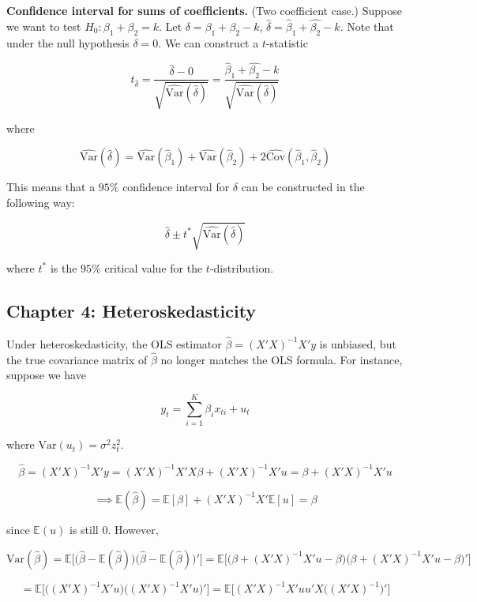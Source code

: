 \documentclass{article}
\newcommand{\E}{\mathbb{E}}
\newcommand{\Var}{\mathrm{Var}}
\newcommand{\Cov}{\mathrm{Cov}}
\begin{document}
\textbf{Confidence interval for sums of coefficients.} (Two coefficient case.) Suppose we want to test \(H_0: \beta_1 + \beta_2 = k\). Let \(\delta = \beta_1 + \beta_2 -k\), \(\hat{\delta} = \hat{\beta}_1 + \hat{\beta_2} -k\). Note that under the null hypothesis \(\delta = 0\). We can construct a \(t\)-statistic

\[
t_{\hat{\delta}} = \frac{\hat{\delta}  - 0}{\sqrt{\hat{\Var}(\hat{\delta})}} = \frac{\hat{\beta}_1 + \hat{\beta_2} -k}{\sqrt{\hat{\Var}(\hat{\delta})}}
\]

where

\[
\hat{\Var}(\hat{\delta}) = \hat{\Var}(\hat{\beta}_1) + \hat{\Var}(\hat{\beta}_2) + 2 \hat{\Cov}(\hat{\beta}_1, \hat{\beta}_2) 
\]

This means that a \(95\%\) confidence interval for \(\delta\) can be constructed in the following way:

\[
\hat{\delta} \pm t^* \sqrt{\hat{\Var}(\hat{\delta})}
\]

where \(t^*\) is the \(95\%\) critical value for the \(t\)-distribution.

\subsection{Chapter 4: Heteroskedasticity}

Under heteroskedasticity, the OLS estimator \(\hat{\beta} = (X'X)^{-1}X'y\) is unbiased, but the true covariance matrix of \(\hat{\beta}\) no longer matches the OLS formula. For instance, suppose we have

\[
y_t = \sum_{i=1}^K \beta_i x_{ti} + u _t
\]

where \(\Var(u_t) = \sigma^2 z_t^2\).

\[
\hat{\beta} = (X'X)^{-1}X'y = (X'X)^{-1}X'X\beta + (X'X)^{-1}X'u = \beta + (X'X)^{-1}X'u 
\]


\[
\implies \E(\hat{\beta}) = \E[\beta] + (X'X)^{-1}X'\E[u] = \beta
\]

since \(\E(u)\) is still 0. However,

\[
\Var(\hat{\beta}) = \E\big[ \big(\hat{\beta} - \E(\hat{\beta}) \big) \big(\hat{\beta} - \E(\hat{\beta}) \big)' \big] = \E \big[\big(\beta + (X'X)^{-1}X'u - \beta \big)\big(\beta + (X'X)^{-1}X'u - \beta \big)' \big]
\]

\[
= \E \big[\big((X'X)^{-1}X'u\big)\big((X'X)^{-1}X'u \big) '\big] = \E \big[ (X'X)^{-1}X'uu'X\big((X'X)^{-1}\big)' \big]
\]
\end{document}
